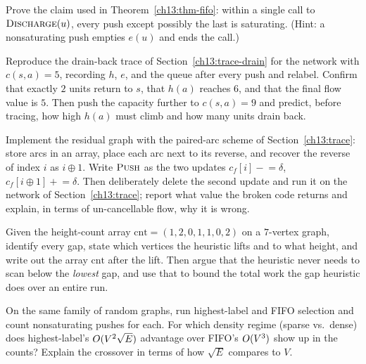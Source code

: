 \begin{exercise}
Prove the claim used in Theorem~\ref{ch13:thm-fifo}: within a single call to $\textsc{Discharge}(u)$, every push except possibly the last is saturating. (Hint: a nonsaturating push empties $e(u)$ and ends the call.)
\end{exercise}

\begin{exercise}
Reproduce the drain-back trace of Section~\ref{ch13:trace-drain} for the network with $c(s,a)=5$, recording $h$, $e$, and the queue after every push and relabel. Confirm that exactly $2$ units return to $s$, that $h(a)$ reaches $6$, and that the final flow value is $5$. Then push the capacity further to $c(s,a)=9$ and predict, before tracing, how high $h(a)$ must climb and how many units drain back.
\end{exercise}

\begin{exercise}
Implement the residual graph with the paired-arc scheme of Section~\ref{ch13:trace}: store arcs in an array, place each arc next to its reverse, and recover the reverse of index $i$ as $i\oplus1$. Write $\textsc{Push}$ as the two updates $c_f[i]\mathrel{-}=\delta$, $c_f[i\oplus1]\mathrel{+}=\delta$. Then deliberately delete the second update and run it on the network of Section~\ref{ch13:trace}; report what value the broken code returns and explain, in terms of un-cancellable flow, why it is wrong.
\end{exercise}

\begin{exercise}
Given the height-count array $\mathrm{cnt}=(1,2,0,1,1,0,2)$ on a $7$-vertex graph, identify every gap, state which vertices the heuristic lifts and to what height, and write out the array $\mathrm{cnt}$ after the lift. Then argue that the heuristic never needs to scan below the \emph{lowest} gap, and use that to bound the total work the gap heuristic does over an entire run.
\end{exercise}

\begin{exercise}
On the same family of random graphs, run highest-label and FIFO selection and count nonsaturating pushes for each. For which density regime (sparse vs.\ dense) does highest-label's $O(V^2\sqrt E)$ advantage over FIFO's $O(V^3)$ show up in the counts? Explain the crossover in terms of how $\sqrt E$ compares to $V$.
\end{exercise}

